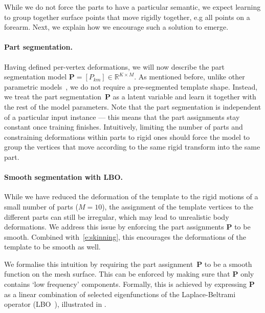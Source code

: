 While we do not force the parts to have a particular semantic, we expect learning to group together surface points that move rigidly together, e.g all points on a forearm.
Next, we explain how we encourage such a solution to emerge.

\paragraph{Part segmentation.}

Having defined per-vertex deformations, we will now describe the part segmentation model $\mathbf{P} = [P_{km}]\in\mathbb{R}^{K\times M}$.
As mentioned before, unlike other parametric models~\cite{loper15smpl:,anguelov05scape:}, we do not require a pre-segmented template shape.
Instead, we treat the part segmentation~$\mathbf{P}$ as a latent variable and learn it together with the rest of the model parameters.
Note that the part segmentation is independent of a particular input instance --- this means that the part assignments stay constant once training finishes.
Intuitively, limiting the number of parts and constraining deformations within parts to rigid ones should force the model to group the vertices that move according to the same rigid transform into the same part.

\paragraph{Smooth segmentation with LBO.}

While we have reduced the deformation of the template to the rigid motions of a small number of parts ($M=10$), the assignment of the template vertices to the different parts can still be irregular, which may lead to unrealistic body deformations.
We address this issue by enforcing the part assignments $\mathbf{P}$ to be smooth.
Combined with~\cref{e:skinning}, this encourages the deformations of the template to be smooth as well.

We formalise this intuition by requiring the part assignment~$\mathbf{P}$ to be a smooth function on the mesh surface.
This can be enforced by making sure that $\mathbf{P}$ only contains `low frequency' components.
Formally, this is achieved by expressing $\mathbf{P}$ as a linear combination of selected eigenfunctions of the Laplace-Beltrami operator (LBO~\cite{rustamov2007laplace}), illustrated in .

